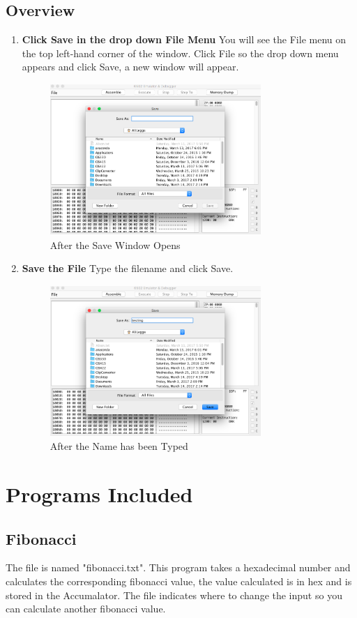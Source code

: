 \documentclass[a3paper, 11pt]{article}
\newlength{\drop}
\begin{document}
\subsection{Overview}
\begin{enumerate}
	\item \textbf{Click Save in the drop down File Menu}
	You will see the File menu on the top left-hand corner of the window. Click File so the drop down menu appears and click Save, a new window will appear. 
	\begin{figure}[h!]
		\centering
		\includegraphics[width=8cm, height=5.74cm]{Save}
		\caption{After the Save Window Opens}
	\end{figure}
	\item \textbf{Save the File}
	Type the filename and click Save.
	\begin{figure}[h!]
		\centering
		\includegraphics[width=8cm, height=5.74cm]{SaveText}
		\caption{After the Name has been Typed}
	\end{figure}
\end{enumerate}
\clearpage

\section{Programs Included} 
\subsection{Fibonacci}
The file is named "fibonacci.txt". This program takes a hexadecimal number and calculates the corresponding fibonacci value, the value calculated is in hex and is stored in the Accumalator. The file indicates where to change the input so you can calculate another fibonacci value.
\end{document}
